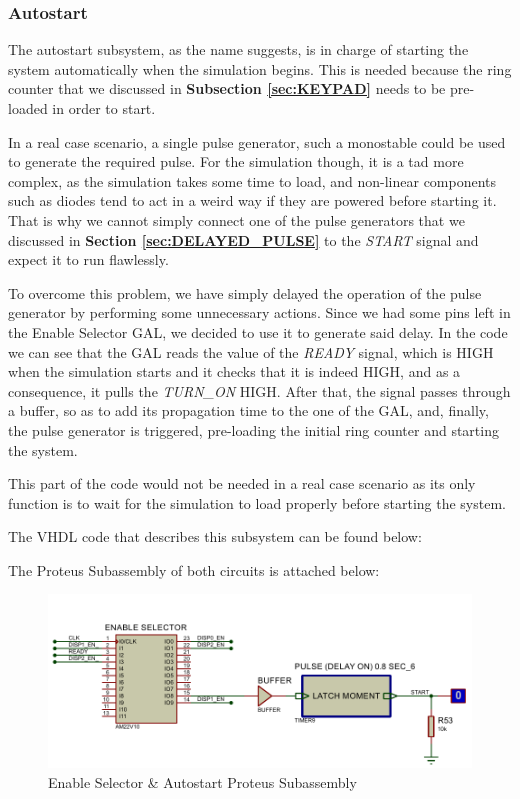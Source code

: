 \subsubsection{Autostart}
\label{sec:AUTOSTART}

The autostart subsystem, as the name suggests, is in charge of starting the system automatically when the simulation begins. This is needed because the ring counter that we discussed in \textbf{Subsection \ref{sec:KEYPAD}} needs to be pre-loaded in order to start.\medskip

In a real case scenario, a single pulse generator, such a monostable could be used to generate the required pulse. For the simulation though, it is a tad more complex, as the simulation takes some time to load, and non-linear components such as diodes tend to act in a weird way if they are powered before starting it. That is why we cannot simply connect one of the pulse generators that we discussed in \textbf{Section \ref{sec:DELAYED_PULSE}} to the \textit{START} signal and expect it to run flawlessly. \medskip 

\clearpage

To overcome this problem, we have simply delayed the operation of the pulse generator by performing some unnecessary actions. Since we had some pins left in the Enable Selector GAL, we decided to use it to generate said delay. In the code we can see that the GAL reads the value of the \textit{READY} signal, which is HIGH when the simulation starts and it checks that it is indeed HIGH, and as a consequence, it pulls the \textit{TURN\_ON} HIGH. After that, the signal passes through a buffer, so as to add its propagation time to the one of the GAL, and, finally, the pulse generator is triggered, pre-loading the initial ring counter and starting the system.\medskip

This part of the code would not be needed in a real case scenario as its only function is to wait for the simulation to load properly before starting the system. \medskip

The VHDL code that describes this subsystem can be found below:


The Proteus Subassembly of both circuits is attached below:

\vspace{-0.5cm}

\begin{figure}[H]
    \centering
    \includegraphics[scale = 0.85]{Graphics/ENABLE SELECTOR + AUTOSTART/ENABLE_SELECTOR_AUTOSTART_PROTEUS.PDF}
    \caption{Enable Selector \& Autostart Proteus Subassembly}
    \label{fig:my_label}
\end{figure}{}

